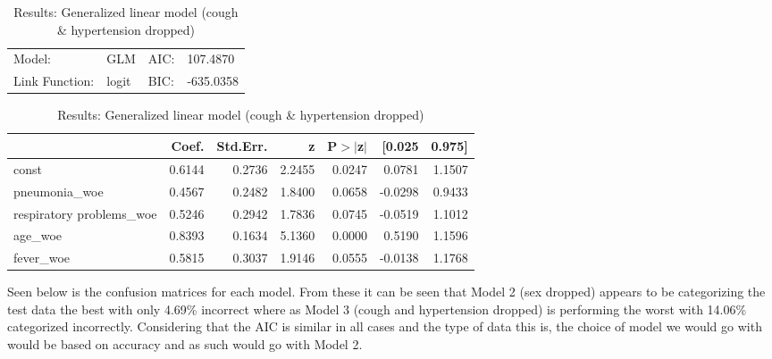 \begin{table}[H]
	\renewcommand{\arraystretch}{1.25}
	\begin{center}
	\begin{tabular}{llll}
	\hline
	Model:              & GLM              & AIC:            & 107.4870   \\
	Link Function:      & logit            & BIC:            & -635.0358  \\
	\hline
	\end{tabular}
	\end{center}
	\begin{center}
	\begin{tabular}{lrrrrrr}
	\hline
	                          & Coef.  & Std.Err. &   z    & P$> |$z$|$ &  [0.025 & 0.975]  \\
	\hline
	\hline
	const                     & 0.6144 &   0.2736 & 2.2455 &      0.0247 &  0.0781 & 1.1507  \\
	pneumonia\_woe            & 0.4567 &   0.2482 & 1.8400 &      0.0658 & -0.0298 & 0.9433  \\
	respiratory problems\_woe & 0.5246 &   0.2942 & 1.7836 &      0.0745 & -0.0519 & 1.1012  \\
	age\_woe                  & 0.8393 &   0.1634 & 5.1360 &      0.0000 &  0.5190 & 1.1596  \\
	fever\_woe                & 0.5815 &   0.3037 & 1.9146 &      0.0555 & -0.0138 & 1.1768  \\
	\hline
	\end{tabular}
	\end{center}
	\caption{Results: Generalized linear model (cough \& hypertension dropped) \label{table:covid_results_3}}
\end{table}

Seen below is the confusion matrices for each model. From these it can be seen that Model 2 (sex dropped) appears to be categorizing the test data the best with only 4.69\% incorrect where as Model 3 (cough and hypertension dropped) is performing the worst with 14.06\% categorized incorrectly. Considering that the AIC is similar in all cases and the type of data this is, the choice of model we would go with would be based on accuracy and as such would go with Model 2.

